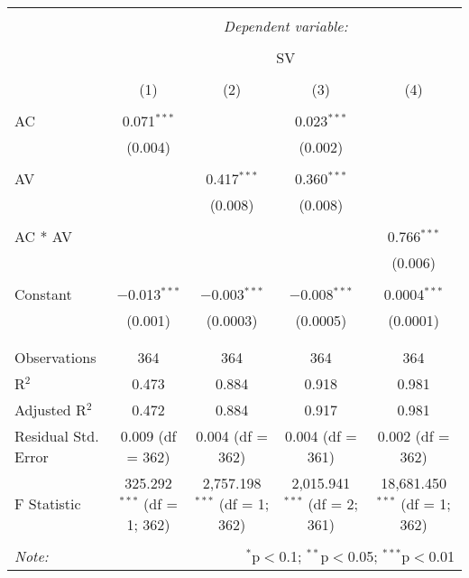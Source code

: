 
\begin{table}[!htbp] \centering 
  \caption{} 
  \label{} 
\begin{tabular}{@{\extracolsep{5pt}}lcccc} 
\\[-1.8ex]\hline 
\hline \\[-1.8ex] 
 & \multicolumn{4}{c}{\textit{Dependent variable:}} \\ 
\cline{2-5} 
\\[-1.8ex] & \multicolumn{4}{c}{SV} \\ 
\\[-1.8ex] & (1) & (2) & (3) & (4)\\ 
\hline \\[-1.8ex] 
 AC & 0.071$^{***}$ &  & 0.023$^{***}$ &  \\ 
  & (0.004) &  & (0.002) &  \\ 
  & & & & \\ 
 AV &  & 0.417$^{***}$ & 0.360$^{***}$ &  \\ 
  &  & (0.008) & (0.008) &  \\ 
  & & & & \\ 
 AC * AV &  &  &  & 0.766$^{***}$ \\ 
  &  &  &  & (0.006) \\ 
  & & & & \\ 
 Constant & $-$0.013$^{***}$ & $-$0.003$^{***}$ & $-$0.008$^{***}$ & 0.0004$^{***}$ \\ 
  & (0.001) & (0.0003) & (0.0005) & (0.0001) \\ 
  & & & & \\ 
\hline \\[-1.8ex] 
Observations & 364 & 364 & 364 & 364 \\ 
R$^{2}$ & 0.473 & 0.884 & 0.918 & 0.981 \\ 
Adjusted R$^{2}$ & 0.472 & 0.884 & 0.917 & 0.981 \\ 
Residual Std. Error & 0.009 (df = 362) & 0.004 (df = 362) & 0.004 (df = 361) & 0.002 (df = 362) \\ 
F Statistic & 325.292$^{***}$ (df = 1; 362) & 2,757.198$^{***}$ (df = 1; 362) & 2,015.941$^{***}$ (df = 2; 361) & 18,681.450$^{***}$ (df = 1; 362) \\ 
\hline 
\hline \\[-1.8ex] 
\textit{Note:}  & \multicolumn{4}{r}{$^{*}$p$<$0.1; $^{**}$p$<$0.05; $^{***}$p$<$0.01} \\ 
\end{tabular} 
\end{table} 
